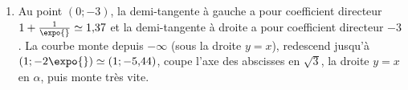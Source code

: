 \begin{corrige}
\begin{sol}
\begin{enumerate}
\begin{enumerate}
      \item Pour $x < 0$ : $f(x) - x = -2 - \ln(\expo{} - x) < 0$ car $\expo{} - x > \expo{}$ : pas d'intersection.
            Pour $0 \leq x \leq \sqrt{3}$ : $f(x) = \expo{x}(x^2-3) \leq 0$, et $f(x) = x$ imposerait $x = 0$, or $f(0) = -3 \neq 0$ : pas d'intersection.
            Sur $[\sqrt{3};+\infty[$, posons $k(x) = \expo{x}(x^2-3) - x$ : $k'(x) = \expo{x}(x^2+2x-3) - 1$ ; pour $x \geq \sqrt{3}$,
            $x^2 + 2x - 3 \geq 2\sqrt{3} > 1$ et $\expo{x} > 1$, donc $k'(x) > 0$. $k$ est continue, strictement croissante,
            $k(\sqrt{3}) = -\sqrt{3} < 0$ et $k(2) = \expo{2} - 2 > 0$ : $k$ s'annule une seule fois, en $\alpha \in ]\sqrt{3};2[$
            ($\alpha \simeq 1{,}815$).
      \end{enumerate}
\item Au point $(0 ; -3)$, la demi-tangente \`a gauche a pour coefficient directeur $1 + \frac{1}{\expo{}} \simeq 1{,}37$ et la demi-tangente \`a droite
      a pour coefficient directeur $-3$. La courbe monte depuis $-\infty$ (sous la droite $y = x$), redescend jusqu'\`a $(1 ; -2\expo{}) \simeq (1;-5{,}44)$,
      coupe l'axe des abscisses en $\sqrt{3}$, la droite $y = x$ en $\alpha$, puis monte tr\`es vite.
\end{enumerate}
\end{sol}


\end{corrige}
